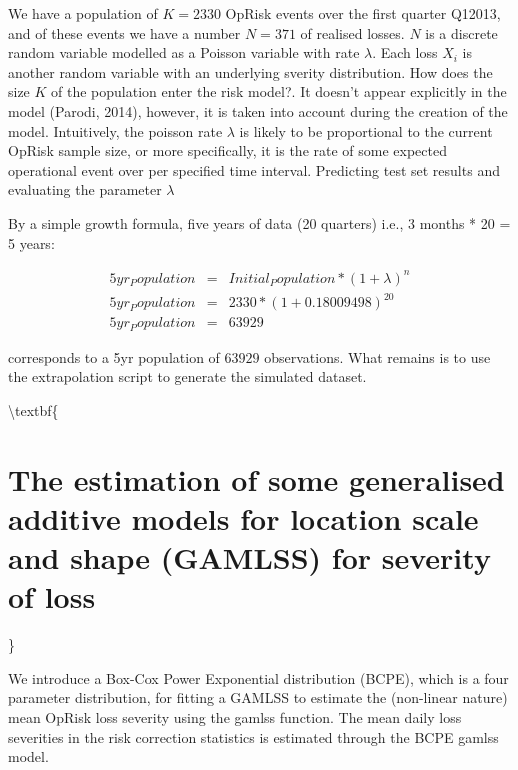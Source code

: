 \documentclass{DissertateUSU}
\begin{document}
We have a population of \(K = 2330\) OpRisk events over the first
quarter Q12013, and of these events we have a number \(N = 371\) of
realised losses. \(N\) is a discrete random variable modelled as a
Poisson variable with rate \(\lambda\). Each loss \(X_i\) is another
random variable with an underlying sverity distribution. How does the
size \(K\) of the population enter the risk model?. It doesn't appear
explicitly in the model (Parodi, 2014), however, it is taken into
account during the creation of the model. Intuitively, the poisson rate
\(\lambda\) is likely to be proportional to the current OpRisk sample
size, or more specifically, it is the rate of some expected operational
event over per specified time interval. Predicting test set results and
evaluating the parameter \(\lambda\)

By a simple growth formula, five years of data (20 quarters) i.e., 3
months * 20 = 5 years:

\singlespacing

\begin{eqnarray}
5yr_Population &=& Initial_Population * (1 + \lambda)^n \nonumber \\
5yr_Population &=& 2330*(1+0.18009498)^20 \nonumber \\
5yr_Population &=& 63929
\end{eqnarray} \doublespacing

corresponds to a 5yr population of \(63929\) observations. What remains
is to use the extrapolation script to generate the simulated dataset.

\textbackslash{}textbf\{

\section{The estimation of some  generalised additive models for location scale and shape (GAMLSS) for severity of loss}

\}
\label{sec:The estimation of some  generalised additive models for location scale and shape (GAMLSS) for severity of loss}

We introduce a Box-Cox Power Exponential distribution (BCPE), which is a
four parameter distribution, for fitting a GAMLSS to estimate the
(non-linear nature) mean OpRisk loss severity using the gamlss function.
The mean daily loss severities in the risk correction statistics is
estimated through the BCPE gamlss model.\medskip
\end{document}
